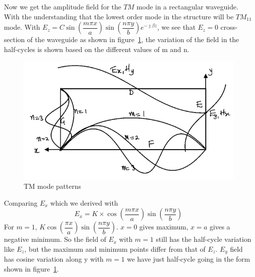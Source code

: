 Now we get the amplitude field for the $TM$ mode in a rectangular waveguide. With the understanding that the lowest order mode in the structure will be $TM_{11}$ mode. With $E_z = C\sin\left(\dfrac{m\pi x}{a}\right)\sin\left(\dfrac{n\pi y}{b}\right)e^{-\jmath\beta z}$, we see that $E_z = 0$ cross-section of the waveguide as shown in figure~\ref{fig:lec38fig3}, the variation of the field in the half-cycles is shown based on the different values of m and n.
\begin{figure}[h]
\centering
\includegraphics[width=0.7\linewidth]{./graphics/lec38fig3}
\caption{TM mode patterns}
\label{fig:lec38fig3}
\end{figure}
Comparing $E_x$ which we derived with 
\begin{dmath*}
E_x = K \times \cos\left(\frac{m\pi x}{a}\right)\sin\left(\frac{n\pi y}{b}\right)
\end{dmath*}
For $m=1$, $K\cos\left(\dfrac{\pi x}{a}\right)\sin\left(\dfrac{n\pi y}{b}\right)$. $x=0$ gives maximum, $x=a$ gives a negative minimum. So the field of $E_x$ with $m=1$ still has the half-cycle variation like $E_z$, but the maximum and minimum points differ from that of $E_z$. $E_y$ field has cosine variation along y with $m=1$ we have just half-cycle going in the form shown in figure~\ref{fig:lec38fig3}.


